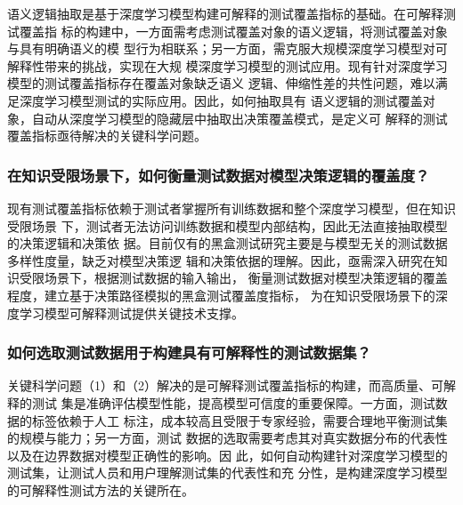 语义逻辑抽取是基于深度学习模型构建可解释的测试覆盖指标的基础。在可解释测试覆盖指
标的构建中，一方面需考虑测试覆盖对象的语义逻辑，将测试覆盖对象与具有明确语义的模
型行为相联系；另一方面，需克服大规模深度学习模型对可解释性带来的挑战，实现在大规
模深度学习模型的测试应用。现有针对深度学习模型的测试覆盖指标存在覆盖对象缺乏语义
逻辑、伸缩性差的共性问题，难以满足深度学习模型测试的实际应用。因此，如何抽取具有
语义逻辑的测试覆盖对象，自动从深度学习模型的隐藏层中抽取出决策覆盖模式，是定义可
解释的测试覆盖指标亟待解决的关键科学问题。


\subsubsection{在知识受限场景下，如何衡量测试数据对模型决策逻辑的覆盖度？}
现有测试覆盖指标依赖于测试者掌握所有训练数据和整个深度学习模型，但在知识受限场景
下，测试者无法访问训练数据和模型内部结构，因此无法直接抽取模型的决策逻辑和决策依
据。目前仅有的黑盒测试研究主要是与模型无关的测试数据多样性度量，缺乏对模型决策逻
辑和决策依据的理解。因此，亟需深入研究在知识受限场景下，根据测试数据的输入输出，
衡量测试数据对模型决策逻辑的覆盖程度，建立基于决策路径模拟的黑盒测试覆盖度指标，
为在知识受限场景下的深度学习模型可解释测试提供关键技术支撑。


\subsubsection{如何选取测试数据用于构建具有可解释性的测试数据集？}
关键科学问题（1）和（2）解决的是可解释测试覆盖指标的构建，而高质量、可解释的测试
集是准确评估模型性能，提高模型可信度的重要保障。一方面，测试数据的标签依赖于人工
标注，成本较高且受限于专家经验，需要合理地平衡测试集的规模与能力；另一方面，测试
数据的选取需要考虑其对真实数据分布的代表性以及在边界数据对模型正确性的影响。因
此，如何自动构建针对深度学习模型的测试集，让测试人员和用户理解测试集的代表性和充
分性，是构建深度学习模型的可解释性测试方法的关键所在。

\iffalse

\begin{figure}[htp]
    \begin{small}
        \begin{center}
            \texttt{[image: ch2\_WBtest.pdf]}
        \end{center}
        \caption{基于层次语义理解的白盒测试研究内容}
        \label{fig:ch2:WBtest}
    \end{small}
\end{figure}


\begin{figure}[htp]
    \begin{small}
        \begin{center}
            \texttt{[image: ch2\_TestSelection.pdf]}
        \end{center}
        \caption{可解释预测模型研究内容}
        \label{fig:ch2:testselection}
    \end{small}
\end{figure}

\fi